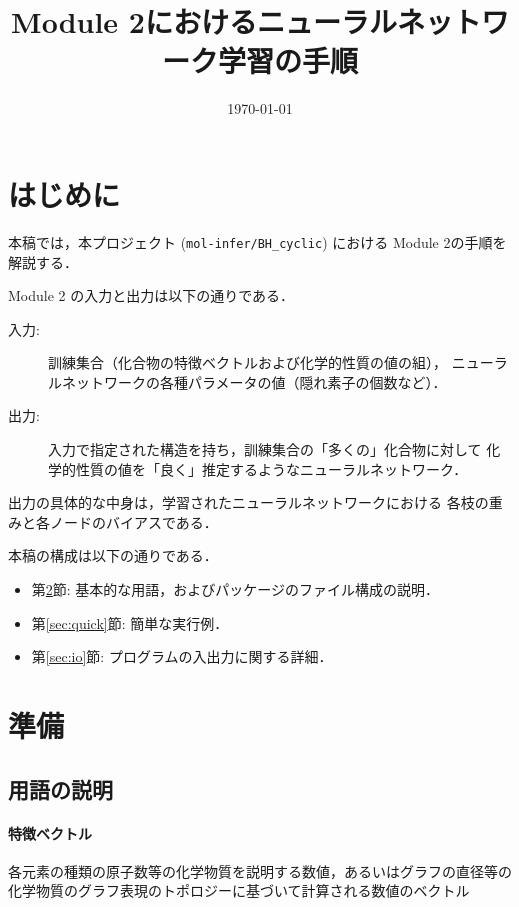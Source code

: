 \documentclass[11pt,dvipdfmx,twoside]{jarticle}
\title{Module 2におけるニューラルネットワーク学習の手順}
\author{\project}
\date{\today}
\newcommand{\project}{{\tt mol-infer/BH\_cyclic}}
\newcommand{\secref}[1]{第\ref{sec:#1}節}
\begin{document}
\maketitle

\makeatletter 
\let\c@lstlisting\c@figure
\makeatother

\section{はじめに}
本稿では，本プロジェクト (\project) における Module 2の手順を解説する．

Module 2 の入力と出力は以下の通りである．
\begin{oframed}
\begin{description}
\item[入力:] 訓練集合（化合物の特徴ベクトルおよび化学的性質の値の組），
  ニューラルネットワークの各種パラメータの値（隠れ素子の個数など）．
\item[出力:] 入力で指定された構造を持ち，訓練集合の「多くの」化合物に対して
  化学的性質の値を「良く」推定するようなニューラルネットワーク．
\end{description}
\end{oframed}
出力の具体的な中身は，学習されたニューラルネットワークにおける
各枝の重みと各ノードのバイアスである．

本稿の構成は以下の通りである．
\begin{itemize}
\item \secref{preparation}: 基本的な用語，およびパッケージのファイル構成の説明．
\item \secref{quick}: 簡単な実行例．
\item \secref{io}: プログラムの入出力に関する詳細．
\end{itemize}

\newpage
\section{準備}
\label{sec:preparation}

\subsection{用語の説明}
\paragraph{特徴ベクトル}
各元素の種類の原子数等の化学物質を説明する数値，あるいはグラフの直径等の化学物質のグラフ表現のトポロジーに基づいて計算される数値のベクトル
\end{document}

